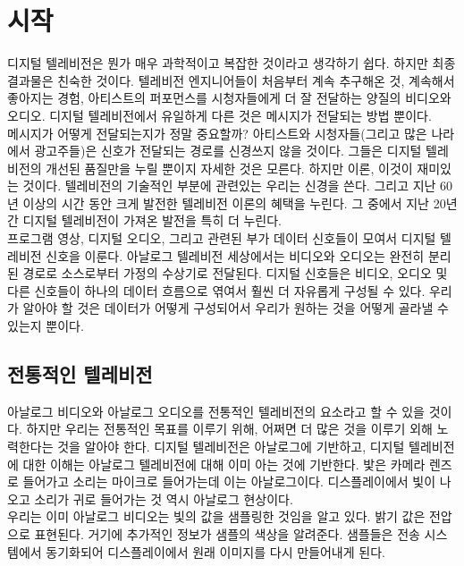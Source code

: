 \chapter{시작}
디지털 텔레비전은 뭔가 매우 과학적이고 복잡한 것이라고 생각하기 쉽다. 하지만 최종 결과물은 친숙한 것이다.
텔레비전 엔지니어들이 처음부터 계속 추구해온 것, 계속해서 좋아지는 경험, 아티스트의 퍼포먼스를 시청자들에게 더 잘 전달하는 양질의 비디오와 오디오.
디지털 텔레비전에서 유일하게 다른 것은 메시지가 전달되는 방법 뿐이다.
\\
메시지가 어떻게 전달되는지가 정말 중요할까? 아티스트와 시청자들(그리고 많은 나라에서 광고주들)은 신호가 전달되는 경로를 신경쓰지 않을 것이다.
그들은 디지털 텔레비전의 개선된 품질만을 누릴 뿐이지 자세한 것은 모른다. 하지만 이론, 이것이 재미있는 것이다.
텔레비전의 기술적인 부분에 관련있는 우리는 신경을 쓴다. 그리고 지난 60년 이상의 시간 동안 크게 발전한 텔레비전 이론의 혜택을 누린다.
그 중에서 지난 20년간 디지털 텔레비전이 가져온 발전을 특히 더 누린다.
\\
프로그램 영상, 디지털 오디오, 그리고 관련된 부가 데이터 신호들이 모여서 디지털 텔레비전 신호을 이룬다.
아날로그 텔레비전 세상에서는 비디오와 오디오는 완전히 분리된 경로로 소스로부터 가정의 수상기로 전달된다.
디지털 신호들은 비디오, 오디오 및 다른 신호들이 하나의 데이터 흐름으로 엮여서 훨씬 더 자유롭게 구성될 수 있다.
우리가 알아야 할 것은 데이터가 어떻게 구성되어서 우리가 원하는 것을 어떻게 골라낼 수 있는지 뿐이다.

\section{전통적인 텔레비전}
아날로그 비디오와 아날로그 오디오를 전통적인 텔레비전의 요소라고 할 수 있을 것이다. 하지만 우리는 전통적인 목표를 이루기 위해, 어쩌면 더 많은 것을 이루기 외해 노력한다는 것을 알아야 한다.
디지털 텔레비전은 아날로그에 기반하고, 디지털 텔레비전에 대한 이해는 아날로그 텔레비전에 대해 이미 아는 것에 기반한다.
밫은 카메라 렌즈로 들어가고 소리는 마이크로 들어가는데 이는 아날로그이다. 디스플레이에서 빛이 나오고 소리가 귀로 들어가는 것 역시 아날로그 현상이다.
\\
우리는 이미 아날로그 비디오는 빛의 값을 샘플링한 것임을 알고 있다. 밝기 값은 전압으로 표현된다. 거기에 추가적인 정보가 샘플의 색상을 알려준다.
샘플들은 전송 시스템에서 동기화되어 디스플레이에서 원래 이미지를 다시 만들어내게 된다.